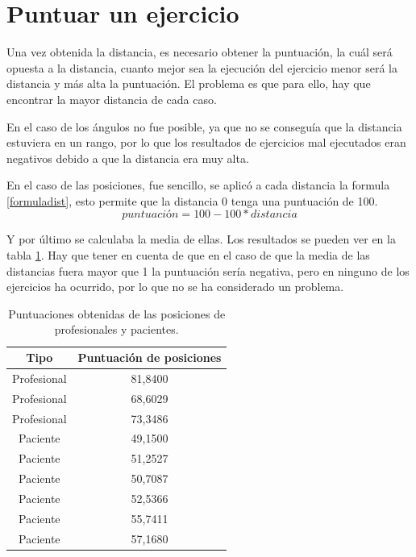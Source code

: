 \section{Puntuar un ejercicio}
Una vez obtenida la distancia, es necesario obtener la puntuación, la cuál será opuesta a la distancia, cuanto mejor sea la ejecución del ejercicio menor será la distancia y más alta la puntuación. El problema es que para ello, hay que encontrar la mayor distancia de cada caso.

En el caso de los ángulos no fue posible, ya que no se conseguía que la distancia estuviera en un rango, por lo que los resultados de ejercicios mal ejecutados eran negativos debido a que la distancia era muy alta.

En el caso de las posiciones, fue sencillo, se aplicó  a cada distancia la formula \ref{formuladist}, esto permite que la distancia 0 tenga una puntuación de 100. 
\begin{equation}
	puntuación = 100-100*distancia
	\label{formuladist}
\end{equation}

Y por último se calculaba la media de ellas. Los resultados se pueden ver en la tabla  \ref{ tab:usedscore}. Hay que tener en cuenta de que en el caso de que la media de las distancias fuera mayor que 1 la puntuación sería negativa, pero en ninguno de los ejercicios ha ocurrido, por lo que no se ha considerado un problema.
\begin{table}
	\centering
	\begin{tabular}{|c|c|}
		\hline
		\textbf{Tipo}  & \textbf{Puntuación de posiciones}\\
		\hline
		Profesional & 81,8400 \\
		\hline
		Profesional & 68,6029 \\
		\hline
		Profesional & 73,3486 \\
		\hline
		Paciente & 49,1500 \\
		\hline
		Paciente & 51,2527 \\
		\hline
		Paciente & 50,7087 \\
		\hline
		Paciente & 52,5366 \\
		\hline
		Paciente & 55,7411 \\
		\hline
		Paciente & 57,1680 \\
		\hline
	\end{tabular}
	\caption{Puntuaciones obtenidas de las posiciones de profesionales y pacientes.}
	\label{ tab:usedscore}
\end{table}

